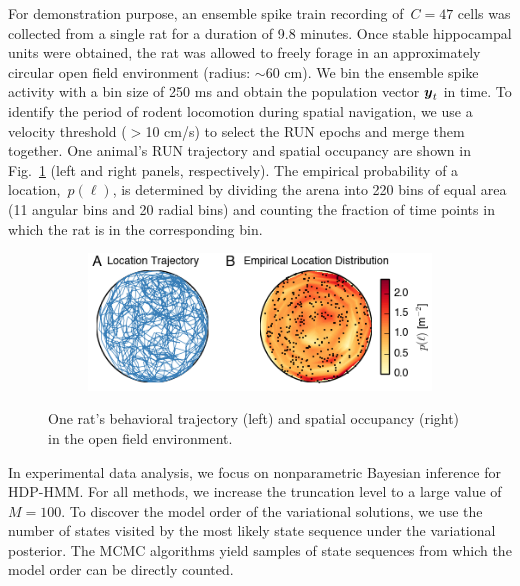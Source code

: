 For demonstration purpose, an ensemble spike train recording of~${C=47}$ cells was collected from a single rat for a duration of 9.8 minutes.
Once   stable hippocampal units were obtained, the rat was allowed to freely forage in an approximately circular open field environment (radius: $\sim$60 cm). 
We bin the ensemble spike activity with a bin size of 250 ms and obtain the population vector $\boldsymbol{y}_t$ in time. 
To identify the period of rodent locomotion during spatial navigation, we use a velocity threshold ($>$10 cm/s) to select the RUN epochs and merge them together. 
One animal's RUN trajectory  and spatial occupancy are shown in Fig.~\ref{fig4} (left and right panels, respectively). The empirical probability of a location,~${p(\ell)}$, is determined by dividing the arena into 220 bins of equal area (11 angular bins and 20 radial bins) and counting the fraction of time points in which the rat is in the corresponding bin. 

\begin{figure}
\centering
\begin{subfigure}[t]{\textwidth}
\centering
\includegraphics[width=4in]{figures/ch5/Fig4}
\end{subfigure}
\caption{One rat's behavioral trajectory (left) and spatial occupancy (right) in the open field environment. }
\label{fig4}
\end{figure}

In experimental data analysis, we focus on  nonparametric Bayesian inference for HDP-HMM.
For all methods, we increase the truncation level to a large value of $M=100$.  To discover the model order of the variational solutions, we use the number of states visited by the most likely state sequence under the variational posterior. The MCMC algorithms yield samples of state sequences from which the model order can be directly counted. 


